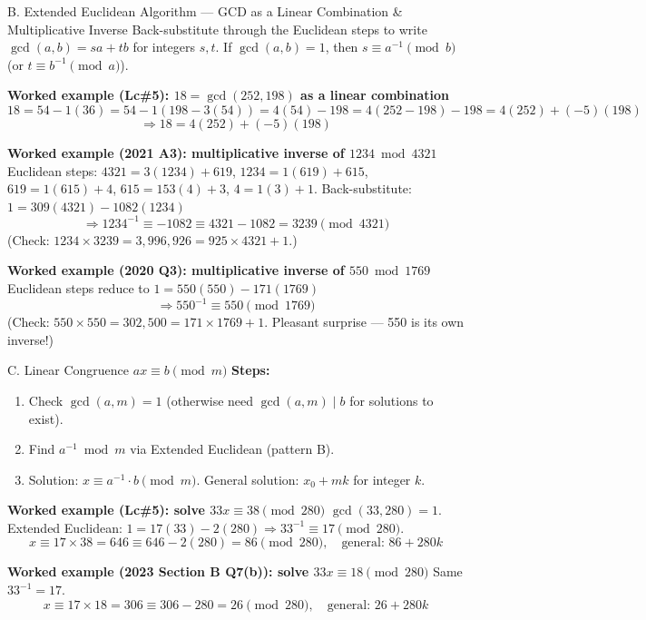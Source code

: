 \documentclass[12pt,a4paper]{article}
\begin{document}
\begin{algobox}{B. Extended Euclidean Algorithm --- GCD as a Linear Combination \& Multiplicative Inverse}
Back-substitute through the Euclidean steps to write $\gcd(a,b)=sa+tb$ for integers $s,t$. If $\gcd(a,b)=1$, then $s \equiv a^{-1} \pmod b$ (or $t \equiv b^{-1} \pmod a$).

\textbf{Worked example (Lc\#5): $18 = \gcd(252,198)$ as a linear combination}
\[
18 = 54-1(36) = 54-1(198-3(54)) = 4(54)-198 = 4(252-198)-198 = 4(252)+(-5)(198)
\]
\[
\Rightarrow 18 = 4(252) + (-5)(198)
\]

\textbf{Worked example (2021 A3): multiplicative inverse of $1234 \bmod 4321$}
Euclidean steps: $4321=3(1234)+619$, $1234=1(619)+615$, $619=1(615)+4$, $615=153(4)+3$, $4=1(3)+1$.
Back-substitute: $1 = 309(4321) - 1082(1234)$
\[
\Rightarrow 1234^{-1} \equiv -1082 \equiv 4321-1082 = \boxed{3239} \pmod{4321}
\]
(Check: $1234 \times 3239 = 3{,}996{,}926 = 925 \times 4321 + 1$.)

\textbf{Worked example (2020 Q3): multiplicative inverse of $550 \bmod 1769$}
Euclidean steps reduce to $1 = 550(550) - 171(1769)$
\[
\Rightarrow 550^{-1} \equiv \boxed{550} \pmod{1769}
\]
(Check: $550 \times 550 = 302{,}500 = 171 \times 1769 + 1$. Pleasant surprise --- 550 is its own inverse!)
\end{algobox}

\begin{algobox}{C. Linear Congruence $ax \equiv b \pmod m$}
\textbf{Steps:}
\begin{enumerate}[noitemsep]
  \item Check $\gcd(a,m)=1$ (otherwise need $\gcd(a,m) \mid b$ for solutions to exist).
  \item Find $a^{-1} \bmod m$ via Extended Euclidean (pattern B).
  \item Solution: $x \equiv a^{-1} \cdot b \pmod m$. General solution: $x_0 + mk$ for integer $k$.
\end{enumerate}

\textbf{Worked example (Lc\#5): solve $33x \equiv 38 \pmod{280}$}
$\gcd(33,280)=1$. Extended Euclidean: $1 = 17(33) - 2(280) \Rightarrow 33^{-1} \equiv 17 \pmod{280}$.
\[
x \equiv 17 \times 38 = 646 \equiv 646 - 2(280) = \boxed{86} \pmod{280}, \quad \text{general: } 86+280k
\]

\textbf{Worked example (2023 Section B Q7(b)): solve $33x \equiv 18 \pmod{280}$}
Same $33^{-1}=17$.
\[
x \equiv 17 \times 18 = 306 \equiv 306-280 = \boxed{26} \pmod{280}, \quad \text{general: } 26+280k
\]
\end{algobox}
\end{document}
